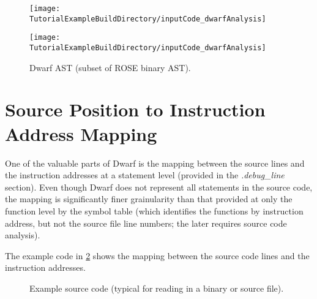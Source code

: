 \begin{figure}[h]
{\indent
{\mySmallFontSize

\begin{latexonly}
   \texttt{[image: \\TutorialExampleBuildDirectory/inputCode\_dwarfAnalysis]}
\end{latexonly}

\begin{htmlonly}
   \texttt{[image: \\TutorialExampleBuildDirectory/inputCode\_dwarfAnalysis]}
\end{htmlonly}

}
}
\caption{Dwarf AST (subset of ROSE binary AST).}
\label{Tutorial:Dwarf_AST_example}
\end{figure}



\section{Source Position to Instruction Address Mapping}

   One of the valuable parts of Dwarf is the mapping between the 
source lines and the instruction addresses at a statement level
(provided in the {\em .debug\_line} section).
Even though Dwarf does not represent all statements in the source
code, the mapping is significantly finer grainularity than that
provided at only the function level by the symbol table (which
identifies the functions by instruction address, but not the 
source file line numbers; the later requires source code analysis).

The example code in \ref{Tutorial:dwarfInstructionAddressToSourceLineExampleSourceCode}
shows the mapping between the source code lines and the instruction addresses.


\begin{figure}[!h]
{\indent
{\mySmallFontSize

\begin{latexonly}
   
\end{latexonly}

\begin{htmlonly}
   
\end{htmlonly}

}
}
\caption{Example source code (typical for reading in a binary or source file).}
\label{Tutorial:dwarfInstructionAddressToSourceLineExampleSourceCode}
\end{figure}

